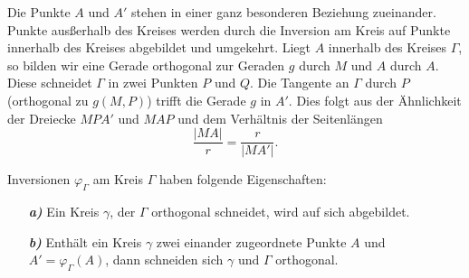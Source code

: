 Die Punkte $A$ und $A'$ stehen in einer ganz besonderen Beziehung
zueinander. Punkte ausßerhalb des Kreises werden durch die Inversion
am Kreis auf Punkte innerhalb des Kreises abgebildet und umgekehrt.
Liegt $A$ innerhalb des Kreises $\Gamma$, so bilden wir eine Gerade
orthogonal zur Geraden $g$ durch $M$ und $A$ durch $A$. Diese schneidet 
$\Gamma$ in zwei Punkten $P$ und $Q$. Die Tangente an $\Gamma$ durch
$P$ (orthogonal zu $g(M,P)$) trifft die Gerade $g$ in $A'$.
Dies folgt aus der Ähnlichkeit der Dreiecke $MPA'$ und $MAP$ und dem
Verhältnis der Seitenlängen
$$
\frac{|MA|}{r} = \frac{r}{|MA'|} 
.
$$


\begin{thm}\label{thm:satz.s4b}
Inversionen $\varphi_\Gamma$ am Kreis $\Gamma$ haben folgende
Eigenschaften:
\begin{enumerate}
    \item[\emph{\textbf{a)}}] Ein Kreis $\gamma$, der $\Gamma$ orthogonal
        schneidet, wird auf sich abgebildet.
    \item[\emph{\textbf{b)}}] Enth\"{a}lt ein Kreis $\gamma$ zwei einander zugeordnete
        Punkte $A$ und $A'=\varphi_\Gamma(A)$, dann schneiden sich
        $\gamma$ und $\Gamma$ orthogonal.
\end{enumerate}
\end{thm}




